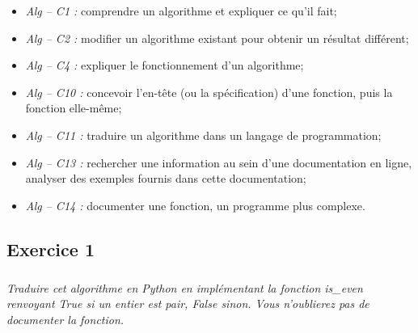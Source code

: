 \documentclass[10pt]{article}
\newif\ifxp
\begin{document}
\ifxp

\else

\fi

\begin{comp}
\begin{itemize}
\item \textit{Alg -- C1 :} comprendre un algorithme et expliquer ce qu’il fait;
\item \textit{Alg -- C2 :} modifier un algorithme existant pour obtenir un résultat différent;
\item \textit{Alg -- C4 :} expliquer le fonctionnement d’un algorithme;
\item \textit{Alg -- C10 :} concevoir l’en-tête (ou la spécification) d’une fonction, puis la fonction elle-même;
\item \textit{Alg -- C11 :} traduire un algorithme dans un langage de programmation;
\item \textit{Alg -- C13 :} rechercher une information au sein d’une documentation en ligne, analyser des exemples fournis dans cette documentation;
\item \textit{Alg -- C14 :} documenter une fonction, un programme plus complexe.
\end{itemize}
\end{comp}

\subsection*{Exercice 1}
\setcounter{subparagraph}{0}

\subparagraph{}\textit{Traduire cet algorithme en Python en implémentant la fonction \textsf{is\_even} renvoyant \textsf{True} si un entier est pair, \textsf{False} sinon. Vous n'oublierez pas de documenter la fonction.}
\end{document}
